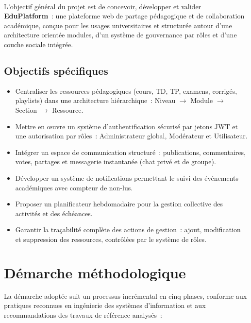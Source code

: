 ﻿﻿\documentclass[12pt,a4paper,oneside]{report}
\begin{document}
L'objectif g\'en\'eral du projet est de concevoir, d\'evelopper et valider \textbf{EduPlatform}~: une plateforme web de partage p\'edagogique et de collaboration acad\'emique, con\c{c}ue pour les usages universitaires et structur\'ee autour d'une architecture orient\'ee modules, d'un syst\`eme de gouvernance par r\^oles et d'une couche sociale int\'egr\'ee.

\subsection{Objectifs sp\'ecifiques}

\begin{itemize}
  \item[\textbf{OS1.}] Centraliser les ressources p\'edagogiques (cours, TD, TP, examens, corrig\'es, playlists) dans une architecture hi\'erarchique~: Niveau $\rightarrow$ Module $\rightarrow$ Section $\rightarrow$ Ressource.
  \item[\textbf{OS2.}] Mettre en \oe uvre un syst\`eme d'authentification s\'ecuris\'e par jetons JWT et une autorisation par r\^oles~: Administrateur global, Mod\'erateur et Utilisateur.
  \item[\textbf{OS3.}] Int\'egrer un espace de communication structur\'e~: publications, commentaires, votes, partages et messagerie instantan\'ee (chat priv\'e et de groupe).
  \item[\textbf{OS4.}] D\'evelopper un syst\`eme de notifications permettant le suivi des \'ev\'enements acad\'emiques avec compteur de non-lus.
  \item[\textbf{OS5.}] Proposer un planificateur hebdomadaire pour la gestion collective des activit\'es et des \'ech\'eances.
  \item[\textbf{OS6.}] Garantir la tra\c{c}abilit\'e compl\`ete des actions de gestion~: ajout, modification et suppression des ressources, contr\^ol\'ees par le syst\`eme de r\^oles.
\end{itemize}

\section{D\'emarche m\'ethodologique}
\label{sec:methodo}

La d\'emarche adopt\'ee suit un processus incr\'emental en cinq phases, conforme aux pratiques reconnues en ing\'enierie des syst\`emes d'information et aux recommandations des travaux de r\'ef\'erence analys\'es~:
\end{document}
